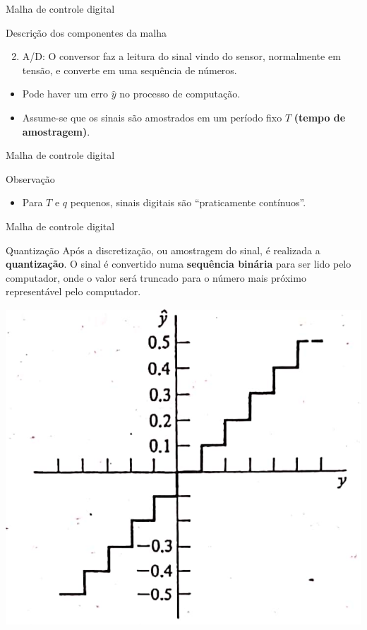 \begin{frame}{Malha de controle digital}
\begin{block}{Descrição dos componentes da malha}
\begin{enumerate}
	\setcounter{enumi}{1}
	\item A/D: O conversor faz a leitura do sinal vindo do sensor, normalmente em tensão, e converte em uma sequência de números.
\end{enumerate}

\vspace{0.5cm}

\begin{itemize}
	\item Pode haver um erro $ \hat{y} $ no processo de computação.
	\item Assume-se que os sinais são amostrados em um período fixo $ T $ \textbf{(tempo de amostragem)}.
\end{itemize}
\end{block}
\end{frame}


\begin{frame}{Malha de controle digital}

\scalebox{0.75}{}

\vspace{0.5cm}

\begin{block}{Observação}
\begin{itemize}
	\item Para $ T $ e $ q $ pequenos, sinais digitais são “praticamente contínuos”.
\end{itemize}
\end{block}

\end{frame}

\begin{frame}{Malha de controle digital}

\begin{block}{Quantização}
Após a discretização, ou amostragem do sinal, é realizada a \textbf{quantização}. O sinal é
convertido numa \textbf{sequência binária} para ser lido pelo computador, onde o valor será truncado para o número mais próximo representável pelo computador.
\end{block}

\vspace{0.2cm}

\centerline{\includegraphics[width=0.4\linewidth]{Figuras/Ch01/fig2.PNG}}

\end{frame}

